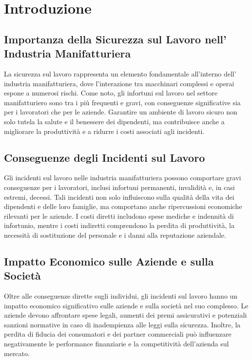 \chapter{Introduzione}

\section{Importanza della Sicurezza sul Lavoro nell' Industria Manifatturiera}

La sicurezza sul lavoro rappresenta un elemento fondamentale all'interno dell' industria manifatturiera, dove l'interazione tra macchinari complessi e operai espone a numerosi rischi. Come noto, gli infortuni sul lavoro nel settore manifatturiero sono tra i più frequenti e gravi, con conseguenze significative sia per i lavoratori che per le aziende. Garantire un ambiente di lavoro sicuro non solo tutela la salute e il benessere dei dipendenti, ma contribuisce anche a migliorare la produttività e a ridurre i costi associati agli incidenti.

\section{Conseguenze degli Incidenti sul Lavoro}

Gli incidenti sul lavoro nelle industria manifatturiera possono comportare gravi conseguenze per i lavoratori, inclusi infortuni permanenti, invalidità e, in casi estremi, decessi. Tali incidenti non solo influiscono sulla qualità della vita dei dipendenti e delle loro famiglie, ma comportano anche ripercussioni economiche rilevanti per le aziende. I costi diretti includono spese mediche e indennità di infortunio, mentre i costi indiretti comprendono la perdita di produttività, la necessità di sostituzione del personale e i danni alla reputazione aziendale.

\section{Impatto Economico sulle Aziende e sulla Società}

Oltre alle conseguenze dirette sugli individui, gli incidenti sul lavoro hanno un impatto economico significativo sulle aziende e sulla società nel suo complesso. Le aziende devono affrontare spese legali, aumenti dei premi assicurativi e potenziali sanzioni normative in caso di inadempienza alle leggi sulla sicurezza. Inoltre, la perdita di fiducia dei consumatori e dei partner commerciali può influenzare negativamente le performance finanziarie e la competitività dell'azienda sul mercato.

